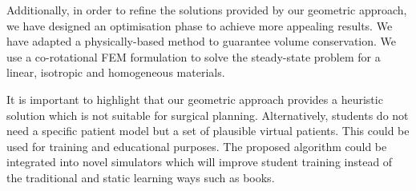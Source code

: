 Additionally, in order to refine the solutions
provided by our geometric approach, we have designed an optimisation phase to achieve more appealing results. We have adapted a  physically-based method to guarantee volume conservation. We use a co-rotational FEM formulation to solve the steady-state problem for a linear, isotropic and homogeneous materials.


It is important to highlight that our geometric approach
provides a heuristic solution which is not suitable for surgical planning. Alternatively, students do not need a specific patient model but a set of plausible virtual patients. This could be used for training and educational purposes. The proposed algorithm could be integrated into novel simulators which will improve student training instead of the traditional and static learning ways such as books.

